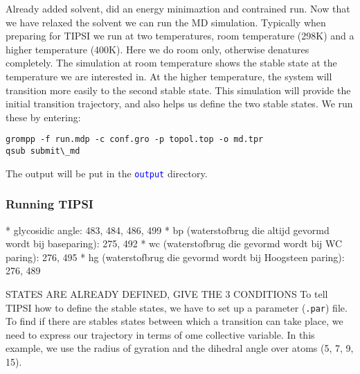 \documentclass[]{article}
\begin{document}
Already added solvent, did an energy minimaztion and contrained run. Now that we have relaxed the solvent we can run the MD simulation. Typically when preparing for \textsc{TIPSI} we run at two temperatures, room temperature (298K) and a higher temperature (400K). Here we do room only, otherwise denatures completely. The simulation at room temperature shows the stable state at the temperature we are interested in. At the higher temperature, the system will transition more easily to the second stable state. This simulation will provide the initial transition trajectory, and also helps us define the two stable states. We run these by entering:
%
\begin{lstlisting}
grompp -f run.mdp -c conf.gro -p topol.top -o md.tpr
qsub submit\_md
\end{lstlisting}
%
The output will be put in the \texttt{\textcolor{blue}{output}} directory.


\subsubsection*{Running TIPSI}

* glycosidic angle: 483, 484, 486, 499
* bp (waterstofbrug die altijd gevormd wordt bij baseparing): 275, 492
* wc (waterstofbrug die gevormd wordt bij WC paring): 276, 495
* hg (waterstofbrug die gevormd wordt bij Hoogsteen paring): 276, 489

STATES ARE ALREADY DEFINED, GIVE THE 3 CONDITIONS
To tell \textsc{TIPSI} how to define the stable states, we have to set up a parameter (\texttt{.par}) file. To find if there are stables states between which a transition can take place, we need to express our trajectory in terms of ome collective variable. In this example, we use the radius of gyration and the dihedral angle over atoms (5, 7, 9, 15).
\end{document}
